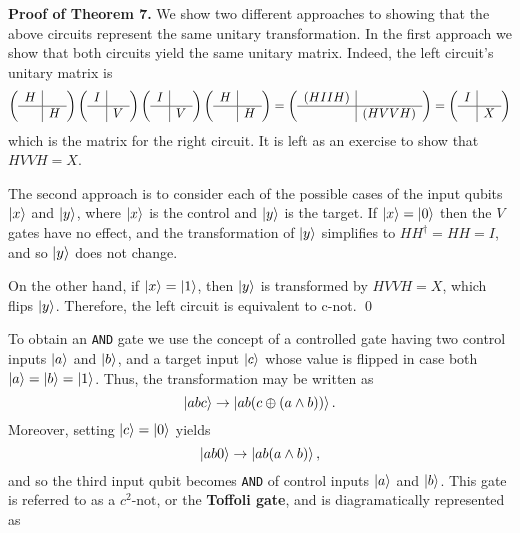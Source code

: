\documentclass [12pt]{article}
\theoremstyle{definition}
\begin{document}
\textbf{Proof of Theorem 7.} We show two different approaches to showing that the above circuits represent the same unitary transformation. 
In the first approach we show that both circuits yield the same unitary matrix. Indeed, the left circuit's unitary matrix is
\[
\left(\begin{array}{c|c}
H & \\
\hline
 &  H \\
\end{array}\right)
\left(\begin{array}{c|c}
I & \\
\hline
 &  V \\
\end{array}\right)
\left(\begin{array}{c|c}
I & \\
\hline
 &  V \\
\end{array}\right)
\left(\begin{array}{c|c}
H & \\
\hline
 &  H \\
\end{array}\right)
=
\left(\begin{array}{c|c}
(HIIH) & \\
\hline
 &  (HVVH) \\
\end{array}\right)
=
\left(\begin{array}{c|c}
I & \\
\hline
 &  X \\
\end{array}\right)
\]
which is the matrix for the right circuit.
It is left as an exercise to show that $HVVH=X$.

The second approach is to consider each of the possible cases of the input qubits $\ket{x}$ and $\ket{y}$, where $\ket{x}$ is the control and $\ket{y}$
is the target. If $\ket{x}=\ket{0}$ then the $V$ gates have no effect, and the transformation of $\ket{y}$ simplifies to $HH^{\dagger}=HH=I$, and so $\ket{y}$ does not change.

On the other hand, if $\ket{x}=\ket{1}$, then $\ket{y}$ is transformed by $HVVH=X$, which flips $\ket{y}$. Therefore, the left circuit is equivalent to c-not. \qed

To obtain an \texttt{AND} gate we use the concept of a controlled gate having two control inputs $\ket{a}$ and $\ket{b}$, and a target input $\ket{c}$ whose value
is flipped in case both $\ket{a}=\ket{b}=\ket{1}$. Thus, the transformation may be written as
\[\ket{abc}\rightarrow\ket{ab(c\oplus(a\wedge b))}.\]
Moreover, setting $\ket{c}=\ket{0}$ yields
\[\ket{ab0}\rightarrow\ket{ab(a\wedge b)},\]
and so the third input qubit becomes \texttt{AND} of control inputs $\ket{a}$ and $\ket{b}$. This gate is referred to as a $c^2\mbox{-not}$, or the
\textbf{Toffoli gate}, and  is diagramatically 
represented as 
\end{document}
